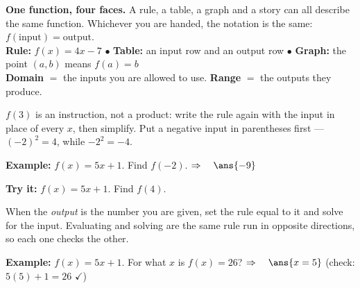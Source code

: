 \documentclass[12pt]{article}
\begin{document}

\begin{formulabox}
\textbf{One function, four faces.} A rule, a table, a graph and a story can all
describe the same function. Whichever you are handed, the notation is the
same: $f(\text{input}) = \text{output}$.\\[3pt]
\textbf{Rule:} $f(x) = 4x - 7$ \quad $\bullet$ \quad \textbf{Table:} an input
row and an output row \quad $\bullet$ \quad \textbf{Graph:} the point $(a, b)$
means $f(a) = b$\\[3pt]
\textbf{Domain} $=$ the inputs you are allowed to use. \textbf{Range} $=$ the
outputs they produce.
\end{formulabox}


\begin{formulabox}
$f(3)$ is an instruction, not a product: write the rule again with the input in
place of every $x$, then simplify. Put a negative input in parentheses first
--- $(-2)^2 = 4$, while $-2^2 = -4$.
\end{formulabox}

\begin{examplebox}
\textbf{Example:} \quad $f(x) = 5x + 1$. Find $f(-2)$.
$\Rightarrow\quad \ans{-9}$
\end{examplebox}

\begin{tryitbox}
\textbf{Try it:} \quad $f(x) = 5x + 1$. Find $f(4)$.\\[2pt]
\end{tryitbox}


\begin{formulabox}
When the \emph{output} is the number you are given, set the rule equal to it
and solve for the input. Evaluating and solving are the same rule run in
opposite directions, so each one checks the other.
\end{formulabox}

\begin{examplebox}
\textbf{Example:} \quad $f(x) = 5x + 1$. For what $x$ is $f(x) = 26$?
$\Rightarrow\quad \ans{x = 5}$ \quad (check: $5(5) + 1 = 26$ $\checkmark$)
\end{examplebox}
\end{document}
